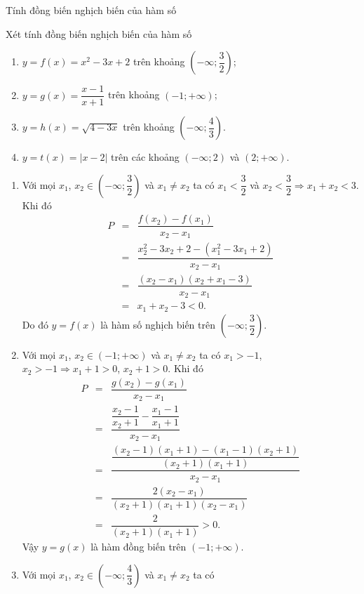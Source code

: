 \begin{dang}{Tính đồng biến nghịch biến của hàm số}

\end{dang}
\viduminhhoa
\begin{vd}%
	Xét tính đồng biến nghịch biến của hàm số
	\begin{enumerate}
		\item $y=f(x)=x^2-3x+2$ trên khoảng $\left(-\infty;
			      \dfrac{3}{2}\right)$;
		\item $y=g(x)=\dfrac{x-1}{x+1}$ trên khoảng $(-1;+\infty)$;
		\item $y=h(x)=\sqrt{4-3x}$ trên khoảng $\left(-\infty;\dfrac{4}{3}\right)$.
		\item $y=t(x)=|x-2|$ trên các khoảng $(-\infty;2)$ và $(2;+\infty)$.
	\end{enumerate}
	\loigiai
	{
		\begin{enumerate}
			\item Với mọi $x_1$, $x_2\in \left(-\infty;
				      \dfrac{3}{2}\right)$ và $x_1\neq x_2$ ta có $x_1<\dfrac{3}{2}$ và $x_2<\dfrac{3}{2}\Rightarrow x_1+x_2<3$. Khi đó
			      \begin{eqnarray*}
				      P&=&\dfrac{f(x_2)-f(x_1)}{x_2-x_1}\\
				      &=&\dfrac{x_2^2-3x_2+2-(x_1^2-3x_1+2)}{x_2-x_1}\\
				      &=&\dfrac{(x_2-x_1)(x_2+x_1-3)}{x_2-x_1}\\
				      &=&x_1+x_2-3<0.
			      \end{eqnarray*}
			      Do đó $y=f(x)$ là hàm số nghịch biến trên $\left(-\infty;\dfrac{3}{2}\right)$.
			\item Với mọi $x_1$, $x_2\in (-1;+\infty)$ và $x_1\neq x_2$ ta có $x_1>-1$, $x_2>-1\Rightarrow x_1+1>0$, $x_2+1>0$. Khi đó
			      \begin{eqnarray*}
				      P&=&\dfrac{g(x_2)-g(x_1)}{x_2-x_1}\\
				      &=&\dfrac{\dfrac{x_2-1}{x_2+1}-\dfrac{x_1-1}{x_1+1}}{x_2-x_1}\\
				      &=&\dfrac{\dfrac{(x_2-1)(x_1+1)-(x_1-1)(x_2+1)}{(x_2+1)(x_1+1)}}{x_2-x_1}\\
				      &=&\dfrac{2(x_2-x_1)}{(x_2+1)(x_1+1)(x_2-x_1)}\\
				      &=&\dfrac{2}{(x_2+1)(x_1+1)}>0.
			      \end{eqnarray*}
			      Vậy $y=g(x)$ là hàm đồng biến trên $(-1;+\infty)$.
			\item Với mọi $x_1$, $x_2\in \left(-\infty;\dfrac{4}{3}\right)$ và $x_1\neq x_2$ ta có

\end{enumerate}}
\end{vd}
